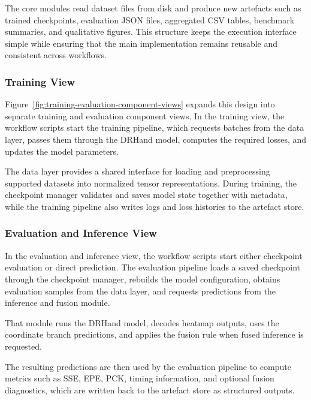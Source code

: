 ﻿\documentclass[11pt,a4paper]{article}
\begin{document}
\medskip

The core modules read dataset files from disk and produce new artefacts such as
trained checkpoints, evaluation JSON files, aggregated CSV tables, benchmark
summaries, and qualitative figures. This structure keeps the execution
interface simple while ensuring that the main implementation remains reusable
and consistent across workflows.

\subsubsection*{Training View}

Figure~\ref{fig:training-evaluation-component-views} expands this design into
separate training and evaluation component views. In the training view, the
workflow scripts start the training pipeline, which requests batches from the
data layer, passes them through the DRHand model, computes the required losses,
and updates the model parameters.

\medskip

The data layer provides a shared interface for loading and preprocessing
supported datasets into normalized tensor representations. During training, the
checkpoint manager validates and saves model state together with metadata,
while the training pipeline also writes logs and loss histories to the
artefact store.

\subsubsection*{Evaluation and Inference View}

In the evaluation and inference view, the workflow scripts start either
checkpoint evaluation or direct prediction. The evaluation pipeline loads a
saved checkpoint through the checkpoint manager, rebuilds the model
configuration, obtains evaluation samples from the data layer, and requests
predictions from the inference and fusion module.

\medskip

That module runs the DRHand model, decodes heatmap outputs, uses the
coordinate branch predictions, and applies the fusion rule when fused
inference is requested.

\medskip

The resulting predictions are then used by the evaluation pipeline to compute
metrics such as SSE, EPE, PCK, timing information, and optional fusion
diagnostics, which are written back to the artefact store as structured
outputs.
\end{document}
